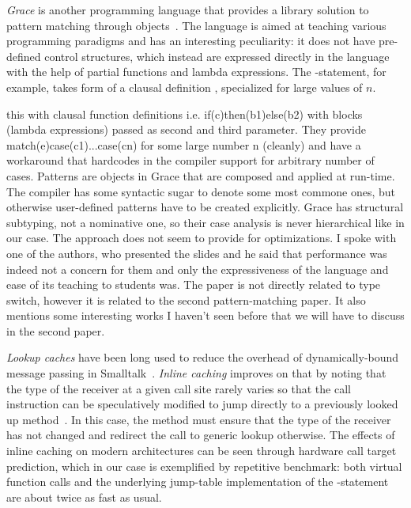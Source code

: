 \emph{Grace} is another programming language that provides a library solution to 
pattern matching through objects~\cite{Grace2012}. The language is aimed at 
teaching various programming paradigms and has an interesting peculiarity: it 
does not have pre-defined control structures, which instead are expressed 
directly in the language with the help of partial functions and lambda 
expressions. The -statement, for example, takes form of a 
clausal definition , specialized for 
large values of $n$. 
 
this with clausal function  
definitions i.e. if(c)then(b1)else(b2) with blocks (lambda expressions) passed 
as second and third parameter. They provide match(e)case(c1)...case(cn) for some 
large number n (cleanly) and have a workaround that hardcodes in the compiler 
support for arbitrary number of cases. Patterns are objects in Grace that are 
composed and applied at run-time. The compiler has some syntactic sugar to 
denote some most commone ones, but otherwise user-defined patterns have to be 
created explicitly. Grace has structural subtyping, not a nominative one, so 
their case analysis is never hierarchical like in our case. The approach does 
not seem to provide for optimizations.  I spoke with one of the authors, who 
presented the slides and he said that performance was indeed not a concern for 
them and only the expressiveness of the language and ease of its teaching to 
students was. The paper is not directly related to type switch, however it is 
related to the second pattern-matching paper. It also mentions some interesting 
works I haven't seen before that we will have to discuss in the second paper. 

\emph{Lookup caches} have been long used to reduce the overhead of 
dynamically-bound message passing in Smalltalk~\cite{UngarPatterson83}. 
\emph{Inline caching} improves on that by noting that the type of the receiver at a given 
call site rarely varies so that the call instruction can be speculatively 
modified to jump directly to a previously looked up method~\cite{Deutsch84}. 
In this case, the method must ensure that the type of the receiver has 
not changed and redirect the call to generic lookup otherwise. The effects of 
inline caching on modern architectures can be seen through hardware call target 
prediction, which in our case is exemplified by repetitive benchmark: both 
virtual function calls and the underlying jump-table implementation of the 
-statement are about twice as fast as usual.

